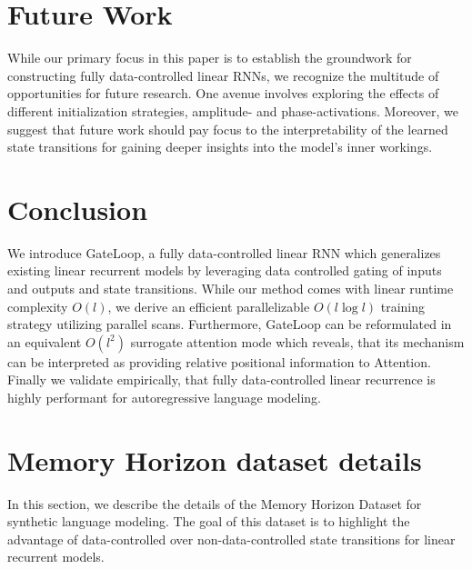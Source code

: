 \documentclass{article} \usepackage{iclr2024_conference,times}
\begin{document}
\section{Future Work}

While our primary focus in this paper is to establish the groundwork for constructing fully data-controlled linear RNNs, we recognize the multitude of opportunities for future research. One avenue involves exploring the effects of different initialization strategies, amplitude- and phase-activations. Moreover, we suggest that future work should pay focus to the interpretability of the learned state transitions for gaining deeper insights into the model's inner workings.

\section{Conclusion}

We introduce GateLoop, a fully data-controlled linear RNN which generalizes existing linear recurrent models by leveraging data controlled gating of inputs and outputs and state transitions. While our method comes with linear runtime complexity $O(l)$,  we derive an efficient parallelizable $O(l \log l)$ training strategy utilizing parallel scans. Furthermore, GateLoop can be reformulated in an equivalent $O(l^2)$ surrogate attention mode which reveals, that its mechanism can be interpreted as providing relative positional information to Attention. Finally we validate empirically, that fully data-controlled linear recurrence is highly performant for autoregressive language modeling.  




\appendix

\section{Memory Horizon dataset details}\label{sec:memory_horizon_details}

In this section, we describe the details of the Memory Horizon Dataset for synthetic language modeling. The goal of this dataset is to highlight the advantage of data-controlled over non-data-controlled state transitions for linear recurrent models.
\end{document}
